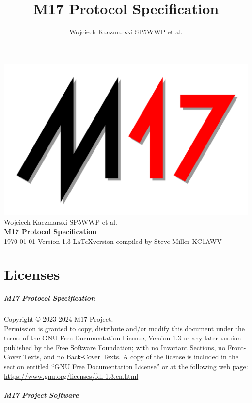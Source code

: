 \documentclass[a4paper,11pt,oneside]{book}
\title{M17 Protocol Specification}
\author{Wojciech Kaczmarski SP5WWP et al.}
\makeatletter
\renewcommand{\frontmatter}{\cleardoublepage\@mainmatterfalse}
\makeatother
\begin{document}
\begin{titlepage}
	\raggedleft
	\includegraphics[width=0.7\linewidth,right]{img/m17_logo_shadow}
	\vspace*{\baselineskip}
	{\Large Wojciech Kaczmarski SP5WWP et al.} \\
	\vspace*{0.167\textheight}
	\textbf{\LARGE M17 Protocol Specification} \\
	\today
	\vfill
	{\large Version 1.3}
	\vfill
	\LaTeX version compiled by Steve Miller KC1AWV
\end{titlepage}

\frontmatter

\tableofcontents

\listoftables

\listoffigures

\chapter{Licenses}

\paragraph{M17 Protocol Specification}

Copyright \copyright{}  2023-2024  M17 Project. \\

Permission is granted to copy, distribute and/or modify this document under the terms of the GNU Free Documentation License, Version 1.3 or any later version published by the Free Software Foundation; with no Invariant Sections, no Front-Cover Texts, and no Back-Cover Texts. A copy of the license is included in the section entitled ``GNU Free Documentation License'' or at the following web page: \href{https://www.gnu.org/licenses/fdl-1.3.en.html}{https://www.gnu.org/licenses/fdl-1.3.en.html}

\paragraph{M17 Project Software}
\end{document}
